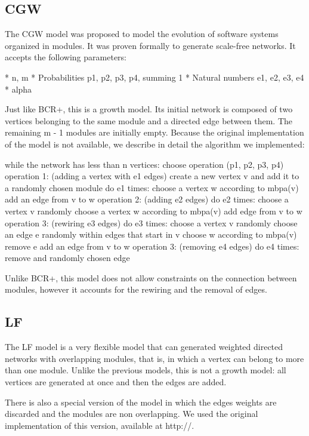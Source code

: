 \subsection{CGW}

The CGW model was proposed to model the evolution of software systems organized in
modules. It was proven formally to generate scale-free networks. \cite{Chen2008}
It accepts the following parameters:

* n, m
* Probabilities p1, p2, p3, p4, summing 1
* Natural numbers e1, e2, e3, e4
* alpha

Just like BCR+, this is a growth model. Its initial network is composed of two
vertices belonging to the same module and a directed edge between them. The
remaining m - 1 modules are initially empty. Because the original implementation
of the model is not available, we describe in detail the algorithm we
implemented:

while the network has less than n vertices:
  choose operation (p1, p2, p3, p4)
  operation 1: (adding a vertex with e1 edges)
    create a new vertex v and add it to a randomly chosen module
    do e1 times:
      choose a vertex w according to mbpa(v)
      add an edge from v to w
  operation 2: (adding e2 edges)
    do e2 times:
      choose a vertex v randomly
      choose a vertex w according to mbpa(v)
      add edge from v to w
  operation 3: (rewiring e3 edges)
    do e3 times:
      choose a vertex v randomly
      choose an edge e randomly within edges that start in v
      choose w according to mbpa(v)
      remove e
      add an edge from v to w
  operation 3: (removing e4 edges)
    do e4 times:
      remove and randomly chosen edge
    

Unlike BCR+, this model does not allow constraints on the connection between
modules, however it accounts for the rewiring and the removal of edges. 

\subsection{LF}

The LF model is a very flexible model that can generated weighted directed
networks with overlapping modules, that is, in which a vertex can belong to more
than one module. Unlike the previous models, this is not a growth model: all
vertices are generated at once and then the edges are added.

There is also a special version of the model in which the edges weights are
discarded and the modules are non overlapping. We used the original
implementation of this version, available at http://. 

